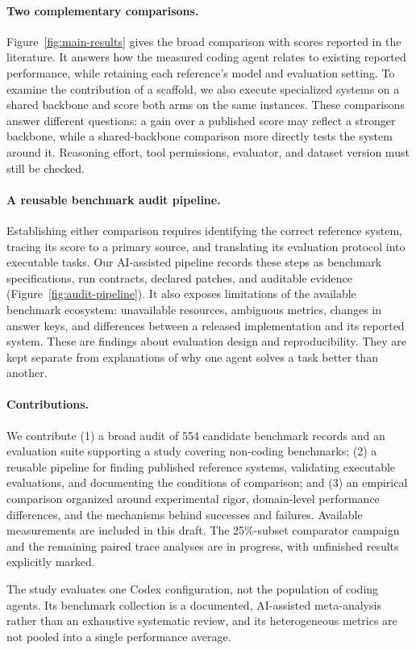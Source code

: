 \paragraph{Two complementary comparisons.}
Figure~\ref{fig:main-results} gives the broad comparison with scores reported in the literature.
It answers how the measured coding agent relates to existing reported performance, while retaining
each reference's model and evaluation setting. To examine the contribution of a scaffold, we also
execute specialized systems on a shared backbone and score both arms on the same instances.
These comparisons answer different questions: a gain over a published score may reflect a
stronger backbone, while a shared-backbone comparison more directly tests the system around it.
Reasoning effort, tool permissions, evaluator, and dataset version must still be checked.

\paragraph{A reusable benchmark audit pipeline.}
Establishing either comparison requires identifying the correct reference system, tracing its
score to a primary source, and translating its evaluation protocol into executable tasks.
Our AI-assisted pipeline records these steps as benchmark specifications, run contracts,
declared patches, and auditable evidence (Figure~\ref{fig:audit-pipeline}). It also exposes
limitations of the available benchmark ecosystem: unavailable resources, ambiguous metrics,
changes in answer keys, and differences between a released implementation and its reported
system. These are findings about evaluation design and reproducibility. They are kept separate
from explanations of why one agent solves a task better than another.

\paragraph{Contributions.}
We contribute (1) a broad audit of 554 candidate benchmark records and an evaluation
suite supporting a study covering \StudyBenchmarkCount{} non-coding benchmarks; (2) a reusable pipeline for
finding published reference systems, validating executable evaluations, and documenting the
conditions of comparison; and (3) an empirical comparison organized around experimental rigor,
domain-level performance differences, and the mechanisms behind successes and failures.
Available measurements are included in this draft. The 25\%-subset comparator campaign and
the remaining paired trace analyses are in progress, with unfinished results explicitly marked.

The study evaluates one Codex configuration, not the population of coding agents. Its benchmark
collection is a documented, AI-assisted meta-analysis rather than an exhaustive systematic
review, and its heterogeneous metrics are not pooled into a single performance average.
